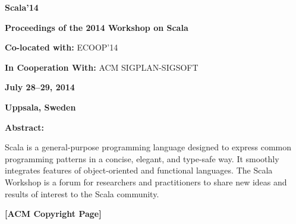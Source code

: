 \documentclass[10pt]{book}
\title{}
\date{}
\begin{document}
\thispagestyle{empty}


{\centering \LARGE \bf Scala'14\par}

\vspace{0.5cm}
\large \textbf{Proceedings of the 2014 Workshop on Scala}

\vspace{0.5cm}
\normalsize
\textbf{Co-located with:} {\large ECOOP'14}

\vspace{0.5cm}
\normalsize
\textbf{In Cooperation With:} {\large ACM SIGPLAN-SIGSOFT}

\vspace{0.5cm}
\normalsize
\textbf{July 28--29, 2014}

\textbf{Uppsala, Sweden}

\vspace{0.5cm}
\normalsize
\noindent
\textbf{Abstract:}

\noindent
Scala is a general-purpose programming language designed to express common
programming patterns in a concise, elegant, and type-safe way. It smoothly
integrates features of object-oriented and functional languages. The Scala
Workshop is a forum for researchers and practitioners to share new ideas and
results of interest to the Scala community.


\newpage
\thispagestyle{empty}

\large \textbf{[ACM Copyright Page]}
\end{document}
